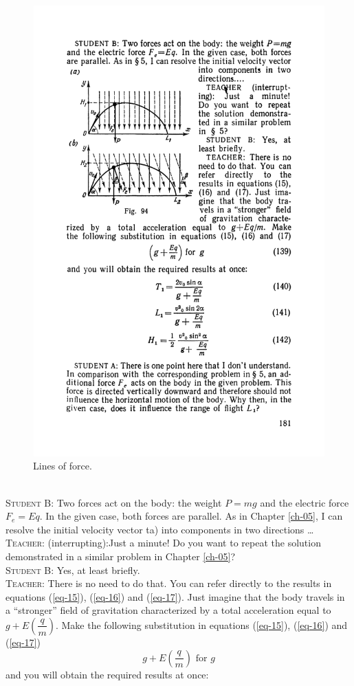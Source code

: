 \documentclass[a4paper,sfsidenotes]{tufte-book}
\begin{document}
\begin{figure}%
\centering
\includegraphics[width=0.6\linewidth]{fig-094a}
\caption{Lines of force.}
\label{fig-94}
\end{figure}
\\
\textsc{Student B:} Two forces act on the body: the weight $P=mg$ and the electric force $F_{e}=Eq$. In the given case, both forces are parallel. As in Chapter \ref{ch-05}, I can resolve the initial velocity vector
ta) into components in two directions \ldots
\\
\textsc{Teacher:} (interrupting):Just a minute! Do you want to repeat the solution demonstrated
in a similar problem in Chapter \ref{ch-05}?
\\
\textsc{Student B:} Yes, at least briefly.
\\
\textsc{Teacher:} There is no need to do that. You can refer directly to the results in equations (\ref{eq-15}), (\ref{eq-16}) and (\ref{eq-17}). Just imagine that the body travels in a ``stronger'' field of gravitation characterized by a total acceleration equal to $g+E \left(\dfrac{q}{m} \right)$. Make the following substitution in equations (\ref{eq-15}), (\ref{eq-16}) and (\ref{eq-17})
\begin{equation}%
 g + E \left(\frac{q}{m} \right) \,\, \text{for} \,\, g 
\label{139}
\end{equation}
and you will obtain the required results at once:\\
\end{document}
